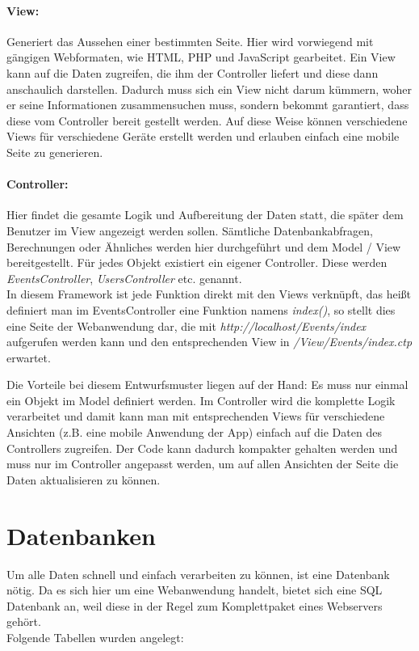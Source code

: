 \paragraph{View:}
Generiert das Aussehen einer bestimmten Seite. Hier wird vorwiegend mit gängigen Webformaten, wie HTML, PHP und JavaScript gearbeitet. Ein View kann auf die Daten zugreifen, die ihm der Controller liefert und diese dann anschaulich darstellen. Dadurch muss sich ein View nicht darum kümmern, woher er seine Informationen zusammensuchen muss, sondern bekommt garantiert, dass diese vom Controller bereit gestellt werden. Auf diese Weise können verschiedene Views für verschiedene Geräte erstellt werden und erlauben einfach eine mobile Seite zu generieren.

\paragraph{Controller:}
Hier findet die gesamte Logik und Aufbereitung der Daten statt, die später dem Benutzer im View angezeigt werden sollen. Sämtliche Datenbankabfragen, Berechnungen oder Ähnliches werden hier durchgeführt und dem Model / View bereitgestellt. Für jedes Objekt existiert ein eigener Controller. Diese werden \emph{EventsController}, \emph{UsersController} etc. genannt.\\
In diesem Framework ist jede Funktion direkt mit den Views verknüpft, das heißt definiert man im EventsController eine Funktion namens \emph{index()}, so stellt dies eine Seite der Webanwendung dar, die mit \emph{http://localhost/Events/index} aufgerufen werden kann und den entsprechenden View in \emph{/View/Events/index.ctp} erwartet.\par

Die Vorteile bei diesem Entwurfsmuster liegen auf der Hand: Es muss nur einmal ein Objekt im Model definiert werden. Im Controller wird die komplette Logik verarbeitet und damit kann man mit entsprechenden Views für verschiedene Ansichten (z.B. eine mobile Anwendung der App) einfach auf die Daten des Controllers zugreifen. Der Code kann dadurch kompakter gehalten werden und muss nur im Controller angepasst werden, um auf allen Ansichten der Seite die Daten aktualisieren zu können.


\section{Datenbanken}
Um alle Daten schnell und einfach verarbeiten zu können, ist eine Datenbank nötig. Da es sich hier um eine Webanwendung handelt, bietet sich eine SQL Datenbank an, weil diese in der Regel zum Komplettpaket eines Webservers gehört.\\
Folgende Tabellen wurden angelegt:

